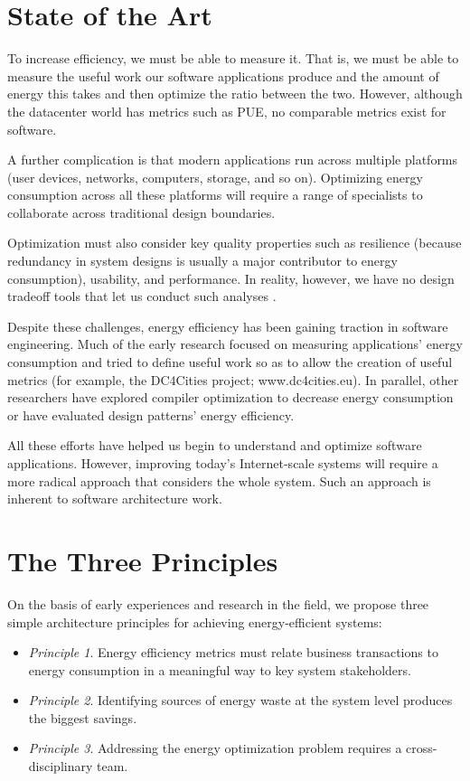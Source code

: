 \section{State of the Art}

To increase efficiency, we must be able to measure it. That is, we must be able to measure the useful work our software applications produce and the amount of energy this takes and then optimize the ratio between the two. However, although the datacenter world has metrics such as PUE, no comparable metrics exist for software.

A further complication is that modern applications run across multiple platforms (user devices, networks, computers, storage, and so on). Optimizing energy consumption across all these platforms will require a range of specialists to collaborate across traditional design boundaries.

Optimization must also consider key quality properties such as resilience (because redundancy in system designs is usually a major contributor to energy consumption), usability, and performance. In reality, however, we have no design tradeoff tools that let us conduct such analyses \cite{bashroush2016-datacentreenergy}.

Despite these challenges, energy efficiency has been gaining traction in software engineering. Much of the early research focused on measuring applications' energy consumption \cite{islam2016-energysoftwarefeatures} and tried to define useful work so as to allow the creation of useful metrics (for example, the DC4Cities project; www.dc4cities.eu). In parallel, other researchers have explored compiler optimization to decrease energy consumption or have evaluated design patterns' energy efficiency.

All these efforts have helped us begin to understand and optimize software applications. However, improving today's Internet-scale systems will require a more radical approach that considers the whole system. Such an approach is inherent to software architecture work.

\section{The Three Principles}

On the basis of early experiences and research in the field, we propose three simple architecture principles for achieving energy-efficient systems:

\begin{itemize}
\item \emph{Principle 1}. Energy efficiency metrics must relate business transactions to energy consumption in a meaningful way to key system stakeholders.
\item \emph{Principle 2}. Identifying sources of energy waste at the system level produces the biggest savings.
\item \emph{Principle 3}. Addressing the energy optimization problem requires a cross-disciplinary team.
\end{itemize}

